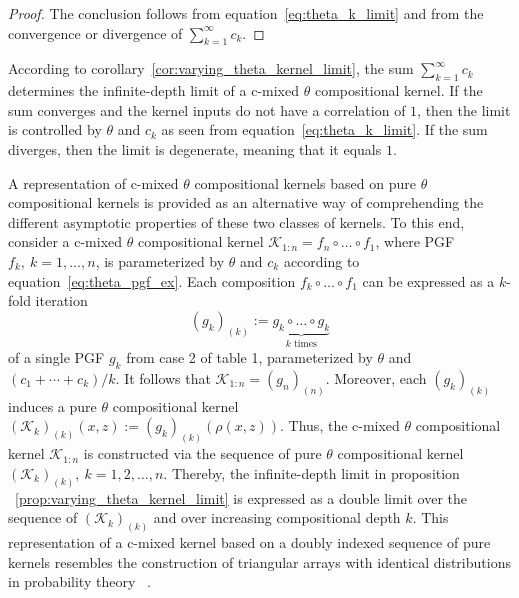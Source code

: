 \documentclass[final, 12pt]{colt2021} %
\begin{document}
\begin{proof}
The conclusion follows
from equation~\eqref{eq:theta_k_limit} and
from the convergence or divergence of
$\sum_{k = 1}^{\infty} c_{k}$.
\end{proof}

According to corollary~\ref{cor:varying_theta_kernel_limit},
the sum $\sum_{k = 1}^{\infty} c_{k}$
determines the infinite-depth limit 
of a c-mixed $\theta$ compositional kernel.
If the sum converges and the kernel inputs do not have a correlation of $1$,
then the limit
is controlled by $\theta$ and $c_k$ as seen from equation~\eqref{eq:theta_k_limit}.
If the sum diverges, then the limit
is degenerate, meaning that it equals $1$.

A representation of c-mixed $\theta$ compositional kernels
based on pure $\theta$ compositional kernels is provided as
an alternative way of comprehending the different asymptotic properties
of these two classes of kernels.
To this end, consider a c-mixed $\theta$ compositional kernel
$\mathcal{K}_{1:n}=f_n\circ\dots\circ f_1$,
where PGF $f_k,~k=1,\ldots,n$,
is parameterized by $\theta$ and $c_k$
according to equation~\eqref{eq:theta_pgf_ex}.
Each composition $f_k\circ\dots\circ f_1$ can be expressed as
a $k$-fold iteration
\begin{equation*}
(g_{k})_{(k)}:=
\underbrace{g_{k}\circ\dots\circ g_{k}}_\text{$k$ times}
\end{equation*}
of a single PGF $g_{k}$ from case 2 of table 1,
parameterized by $\theta$ and $(c_{1} + \cdots + c_{k}) / k$.
It follows that
$\mathcal{K}_{1:n}=(g_{n})_{(n)}$.
Moreover, each $(g_{k})_{(k)}$ induces a
pure $\theta$ compositional kernel
$(\mathcal{K}_{k})_{(k)}(x,z):=(g_k)_{(k)}(\rho (x, z))$.
Thus, the c-mixed $\theta$ compositional kernel $\mathcal{K}_{1:n}$
is constructed via the sequence of pure $\theta$ compositional kernel
$(\mathcal{K}_{k})_{(k)},~k=1,2,\dots,n$.
Thereby, the infinite-depth limit in proposition
~\ref{prop:varying_theta_kernel_limit}
is expressed as a double limit
over the sequence of $(\mathcal{K}_{k})_{(k)}$
and over increasing compositional depth $k$.
This representation of a c-mixed kernel
based on a doubly indexed sequence of pure kernels
resembles the construction of triangular arrays
with identical distributions in probability theory
~\citep[section IX.7]{feller1971}.

\end{document}
